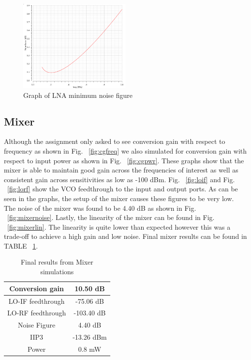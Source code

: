 \begin{figure}[h]
   \centering
    \includegraphics[width=0.5\textwidth]{figures/lnanoisemin.png}
    \caption{Graph of LNA minimum noise figure}
    \label{fig:lnanoisemin}
\end{figure}

\subsection{Mixer}
Although the assignment only asked to see conversion gain with respect to frequency as shown in Fig. ~\ref{fig:cgfreq} we also simulated for conversion gain with respect to input power as shown in Fig. ~\ref{fig:cgpwr}. These graphs show that the mixer is able to maintain good gain across the frequencies of interest as well as consistent gain across sensitivities as low as -100 dBm. Fig. ~\ref{fig:loif} and Fig. ~\ref{fig:lorf} show the VCO feedthrough to the input and output ports. As can be seen in the graphs, the setup of the mixer causes these figures to be very low. The noise of the mixer was found to be 4.40 dB as shown in Fig. ~\ref{fig:mixernoise}. Lastly, the linearity of the mixer can be found in Fig. ~\ref{fig:mixerlin}. The linearity is quite lower than expected however this was a trade-off to achieve a high gain and low noise. Final mixer results can be found in TABLE ~\ref{tab:mixerresults}.

\begin{table}[h]
\begin{center}
	\begin{tabular}{ |c | c | }
 		\hline                      
  		Conversion gain &  10.50 dB\\ \hline
  		LO-IF feedthrough &  -75.06 dB\\ \hline
  		LO-RF feedthrough & -103.40 dB\\ \hline
		Noise Figure &  4.40 dB\\ \hline
		IIP3 & -13.26 dBm\\ \hline
		Power & 0.8 mW \\ 
  		\hline  
	\end{tabular}

\end{center}
\caption{Final results from Mixer simulations}
\label{tab:mixerresults}
\end{table}

